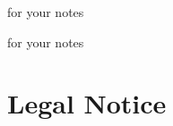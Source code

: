 \newpage
\pagestyle{cropmarksstyle}
\begin{center}
  for your notes
\end{center}

\newpage
\pagestyle{cropmarksstyle}
\begin{center}
  for your notes
\end{center}

\newpage
\pagestyle{citymap}
\label{maps}
\null
\newpage
\null

\newpage
\pagestyle{metro}
\label{metromap}
\null

\newpage
\section*{Legal Notice}
\label{legal}
\pagestyle{cropmarksstyle}

